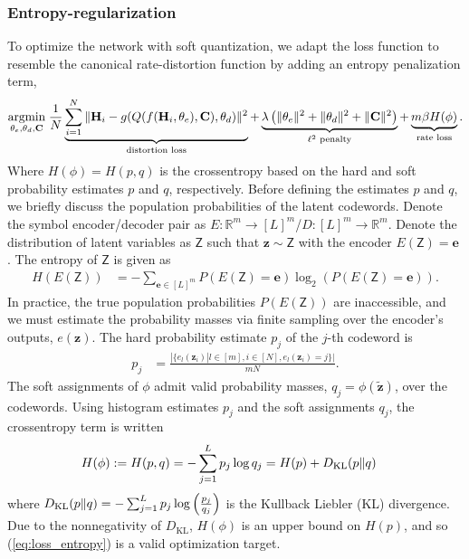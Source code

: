 \subsubsection{Entropy-regularization}
To optimize the network with soft quantization, we adapt the loss function to resemble the canonical rate-distortion function by adding an entropy penalization term,
\begin{align}
\underset{\theta_e, \theta_d, \mathbf C}{\text{argmin}}\; \frac 1N \underbrace{\sum_{i=1}^N\Arrowvert \mathbf H_i - g(Q(f(\mathbf H_i, \theta_e), \mathbf C), \theta_d) \Arrowvert^2}_{\text{distortion loss}} + \underbrace{\lambda \left(\Arrowvert\theta_e\Arrowvert^2+\Arrowvert\theta_d\Arrowvert^2+\Arrowvert \mathbf C \Arrowvert^2\right)}_{\ell^2\text{ penalty}} + \underbrace{m\beta H(\phi)}_{\text{rate loss}}. \label{eq:loss_entropy}
\end{align}
Where $H(\phi)=H(p,q)$ is the crossentropy based on the hard and soft probability estimates $p$ and $q$, respectively. Before defining the estimates $p$ and $q$, we briefly discuss the population probabilities of the latent codewords. Denote the symbol encoder/decoder pair as $E:\mathbb R^m \to [L]^m$/$D:[L]^m \to \mathbb R^m$. Denote the distribution of latent variables as $\mathsf Z$ such that $\mathbf z \sim \mathsf Z$ with the encoder $E(\mathsf Z)=\mathbf e$ . The entropy of $\mathsf Z$ is given as 
\begin{align*}
H(E(\mathsf Z)) &= -\sum_{\mathbf e\in[L]^m}P(E(\mathsf Z) = \mathbf e)\log_2(P(E(\mathsf Z)=\mathbf e)).
\end{align*}
In practice, the true population probabilities $P(E(\mathsf Z))$ are inaccessible, and we must estimate the probability masses via finite sampling over the encoder's outputs, $e(\mathbf z)$. The hard probability estimate $p_j$ of the $j$-th codeword is
\begin{align*}
p_j &= \frac{|\{e_l(\mathbf z_i)|l\in[m], i \in [N], e_l(\mathbf z_i)=j\}|}{mN}.
\end{align*}
The soft assignments of $\phi$ admit valid probability masses, $q_j = \phi(\tilde{\mathbf z})$, over the codewords. Using histogram estimates $p_j$ and the soft assignments $q_j$, the crossentropy term is written
\begin{align*}
H(\phi) := H(p,q) &= -\sum_{j=1}^L p_j\log q_j = H(p) + D_{\text{KL}}(p\Arrowvert q)
\end{align*}
where $D_{\text{KL}}(p\Arrowvert q)=-\sum_{j=1}^L p_j \log\left(\frac{p_j}{q_j}\right)$ is the Kullback Liebler (KL) divergence. Due to the nonnegativity of $D_{\text{KL}}$, $H(\phi)$ is an upper bound on $H(p)$, and so (\ref{eq:loss_entropy}) is a valid optimization target.

